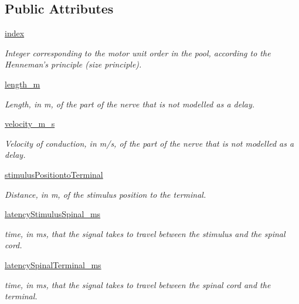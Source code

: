 \subsection*{Public Attributes}
\begin{DoxyCompactItemize}
\item 
\hyperlink{class_axon_delay_1_1_axon_delay_a5dbb9b5002d4b54bf347f48337bdb1c6}{index}
\begin{DoxyCompactList}\small\item\em Integer corresponding to the motor unit order in the pool, according to the Henneman's principle (size principle). \end{DoxyCompactList}\item 
\hyperlink{class_axon_delay_1_1_axon_delay_a08ab7285929002db2108179ea9f5d5dd}{length\-\_\-m}
\begin{DoxyCompactList}\small\item\em Length, in m, of the part of the nerve that is not modelled as a delay. \end{DoxyCompactList}\item 
\hyperlink{class_axon_delay_1_1_axon_delay_a59cc448f95b38b88b7103c3058e8c397}{velocity\-\_\-m\-\_\-s}
\begin{DoxyCompactList}\small\item\em Velocity of conduction, in m/s, of the part of the nerve that is not modelled as a delay. \end{DoxyCompactList}\item 
\hyperlink{class_axon_delay_1_1_axon_delay_a3f6bb8f38c4474806544d01fbe9c0361}{stimulus\-Positionto\-Terminal}
\begin{DoxyCompactList}\small\item\em Distance, in m, of the stimulus position to the terminal. \end{DoxyCompactList}\item 
\hyperlink{class_axon_delay_1_1_axon_delay_a81ea09febed911b8f5e4d56a5f434f8d}{latency\-Stimulus\-Spinal\-\_\-ms}
\begin{DoxyCompactList}\small\item\em time, in ms, that the signal takes to travel between the stimulus and the spinal cord. \end{DoxyCompactList}\item 
\hyperlink{class_axon_delay_1_1_axon_delay_aaa0b8daf2629cd7fa19d539fe2168d0f}{latency\-Spinal\-Terminal\-\_\-ms}
\begin{DoxyCompactList}\small\item\em time, in ms, that the signal takes to travel between the spinal cord and the terminal. \end{DoxyCompactList}\item 

\end{DoxyCompactItemize}
